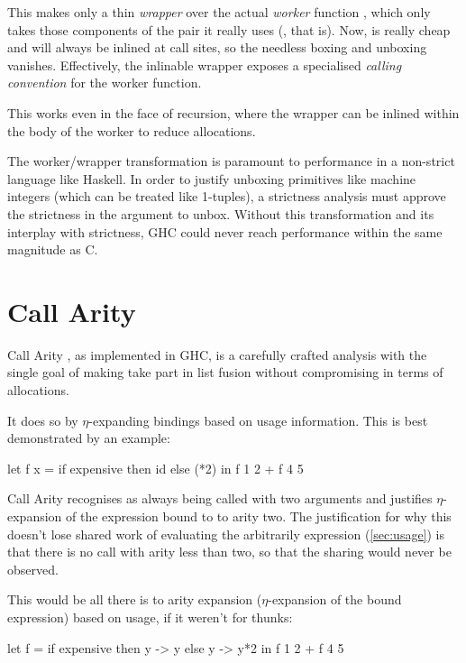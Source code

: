 This makes  only a thin \emph{wrapper} over the actual \emph{worker} function , which only takes those components of the pair it really uses (, that is).
Now,  is really cheap and will always be inlined at call sites, so the needless boxing and unboxing vanishes.
Effectively, the inlinable wrapper exposes a specialised \emph{calling convention} for the worker function.

This works even in the face of recursion, where the wrapper can be inlined within the body of the worker to reduce allocations.

The worker/wrapper transformation is paramount to performance in a non-strict language like Haskell. 
In order to justify unboxing primitives like machine integers (which can be treated like 1-tuples), a strictness analysis must approve the strictness in the argument to unbox.
Without this transformation and its interplay with strictness, GHC could never reach performance within the same magnitude as C.

\section{Call Arity}\label{sec:callarity}

Call Arity \parencite{callarity}, as implemented in GHC, is a carefully crafted analysis with the single goal of making  take part in list fusion without compromising in terms of allocations.

It does so by $\eta$-expanding bindings based on usage information.
This is best demonstrated by an example:
\begin{haskellcode}
  let f x = 
        if expensive
        then id 
        else (*2)
  in f 1 2 + f 4 5
\end{haskellcode}

Call Arity recognises  as always being called with two arguments and justifies $\eta$-expansion of the expression bound to  to arity two.
The justification for why this doesn't lose shared work of evaluating the arbitrarily  expression (\cf \cref{sec:usage}) is that there is no call with arity less than two, so that the sharing would never be observed.

This would be all there is to arity expansion (\eg $\eta$-expansion of the bound expression) based on usage, if it weren't for thunks:
\begin{haskellcode}
  let f =
        if expensive
        then \x y -> y
        else \x y -> y*2
  in f 1 2 + f 4 5
\end{haskellcode}

